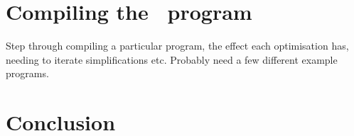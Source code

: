 \section{Compiling the \derp\ program}

Step through compiling a particular program, the effect each optimisation has,
needing to iterate simplifications etc. Probably need a few different example
programs.

\section{Conclusion}

% 

% 
% 
% 
% 
% 


